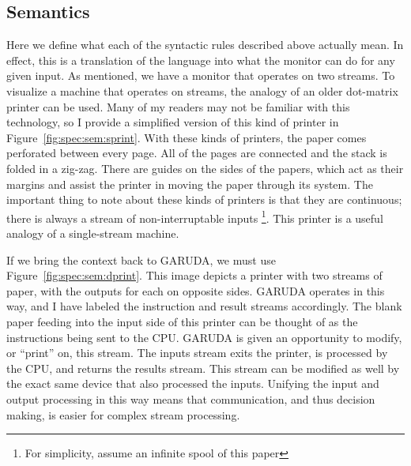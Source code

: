 \documentclass[sigconf,usenames,dvipsnames,svgnames,table]{acmart}
\def \oldname {\textsc{GARUDA}\xspace}
\begin{document}
    \subsection{Semantics}\label{sec:spec:sem}
      Here we define what each of the syntactic rules described above actually mean.
      In effect, this is a translation of the language into what the monitor can do for any given input.
      As mentioned, we have a monitor that operates on two streams.
      To visualize a machine that operates on streams, the analogy of an older dot-matrix printer can be used.
      Many of my readers may not be familiar with this technology, so I provide a simplified version of this kind of printer in Figure~\ref{fig:spec:sem:sprint}.
      With these kinds of printers, the paper comes perforated between every page.
      All of the pages are connected and the stack is folded in a zig-zag.
      There are guides on the sides of the papers, which act as their margins and assist the printer in moving the paper through its system.
      The important thing to note about these kinds of printers is that they are continuous; there is always a stream of non-interruptable inputs \footnote{For simplicity, assume an infinite spool of this paper}.
      This printer is a useful analogy of a single-stream machine.
      \par

      If we bring the context back to \oldname, we must use Figure~\ref{fig:spec:sem:dprint}.
      This image depicts a printer with two streams of paper, with the outputs for each on opposite sides.
      \oldname operates in this way, and I have labeled the instruction and result streams accordingly.
      The blank paper feeding into the input side of this printer can be thought of as the instructions being sent to the CPU.
      \oldname is given an opportunity to modify, or ``print'' on, this stream.
      The inputs stream exits the printer, is processed by the CPU, and returns the results stream.
      This stream can be modified as well by the exact same device that also processed the inputs.
      Unifying the input and output processing in this way means that communication, and thus decision making, is easier for complex stream processing.
      \par
\end{document}

